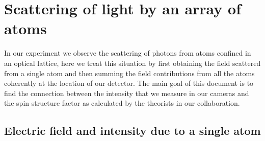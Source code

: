 \documentclass[11pt,letter]{article}
\begin{document}
\section{Scattering of light by an array of atoms}

In our experiment we observe the scattering of photons from atoms confined in
an optical lattice, here we treat this situation by first obtaining  the field
scattered from a single atom and then summing the field contributions from all
the atoms coherently at the location of our detector.  The main goal of this
document is to find the connection between the intensity that we measure in our
cameras and the spin structure factor as calculated by the theorists in our
collaboration.  

\subsection{Electric field and intensity due to a single atom}
\end{document}
